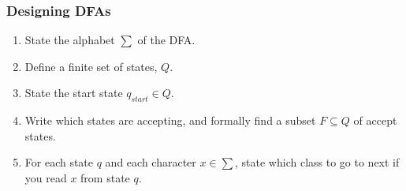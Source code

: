 \documentclass{article}
\begin{document}
    \subsubsection{Designing DFAs}
    \begin{enumerate}
        \item State the alphabet $\sum$ of the DFA.
        \item Define a finite set of states, $Q$.
        \item State the start state $q_{start} \in Q$.
        \item Write which states are accepting, and formally find a subset $F \subseteq Q$ of accept states.
        \item For each state $q$ and each character $x \in \sum$, state which class to go to next if you read $x$ from state $q$.
    \end{enumerate}
    
\end{document}
